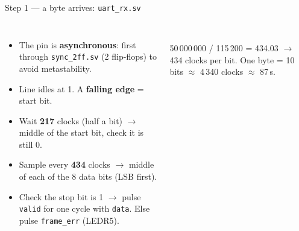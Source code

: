 \documentclass[aspectratio=169,11pt]{beamer}
\newcommand{\file}[1]{\texttt{\textcolor{copper}{#1}}}
\newcommand{\sig}[1]{\texttt{#1}}
\begin{document}
\begin{frame}{Step 1 --- a byte arrives: \file{uart\_rx.sv}}
  \begin{columns}[T]
    \small
    \begin{itemize}
      \item The pin is \textbf{asynchronous}: first through \file{sync\_2ff.sv} (2 flip-flops)
            to avoid metastability.
      \item Line idles at 1. A \textbf{falling edge} = start bit.
      \item Wait \textbf{217} clocks (half a bit) $\to$ middle of the start bit, check it is still 0.
      \item Sample every \textbf{434} clocks $\to$ middle of each of the 8 data bits (LSB first).
      \item Check the stop bit is 1 $\to$ pulse \sig{valid} for one cycle with \sig{data}.
            Else pulse \sig{frame\_err} (LEDR5).
    \end{itemize}
    \\[2mm]
    \scriptsize\color{muted} 50\,000\,000 / 115\,200 = 434.03 $\to$ 434 clocks per bit.
    One byte = 10 bits $\approx$ 4\,340 clocks $\approx$ 87\,\textmu s.
  \end{columns}
\end{frame}
\end{document}

